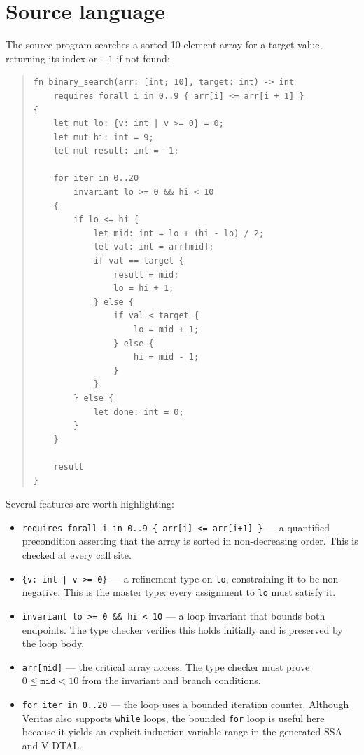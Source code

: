 \section{Source language}
%
The source program searches a sorted 10-element array for a target value, returning its index or $-1$ if not found:
%
\begin{quote}
\begin{verbatim}
fn binary_search(arr: [int; 10], target: int) -> int
    requires forall i in 0..9 { arr[i] <= arr[i + 1] }
{
    let mut lo: {v: int | v >= 0} = 0;
    let mut hi: int = 9;
    let mut result: int = -1;

    for iter in 0..20
        invariant lo >= 0 && hi < 10
    {
        if lo <= hi {
            let mid: int = lo + (hi - lo) / 2;
            let val: int = arr[mid];
            if val == target {
                result = mid;
                lo = hi + 1;
            } else {
                if val < target {
                    lo = mid + 1;
                } else {
                    hi = mid - 1;
                }
            }
        } else {
            let done: int = 0;
        }
    }

    result
}
\end{verbatim}
\end{quote}
%
Several features are worth highlighting:
%
\begin{itemize}
  \item \texttt{requires forall i in 0..9 \{ arr[i] <= arr[i+1] \}} --- a quantified precondition asserting that the array is sorted in non-decreasing order. This is checked at every call site.
  \item \texttt{\{v: int | v >= 0\}} --- a refinement type on \texttt{lo}, constraining it to be non-negative. This is the master type: every assignment to \texttt{lo} must satisfy it.
  \item \texttt{invariant lo >= 0 \&\& hi < 10} --- a loop invariant that bounds both endpoints. The type checker verifies this holds initially and is preserved by the loop body.
  \item \texttt{arr[mid]} --- the critical array access. The type checker must prove $0 \le \mathtt{mid} < 10$ from the invariant and branch conditions.
  \item \texttt{for iter in 0..20} --- the loop uses a bounded iteration counter. Although Veritas also supports \texttt{while} loops, the bounded \texttt{for} loop is useful here because it yields an explicit induction-variable range in the generated SSA and V-DTAL.
\end{itemize}

